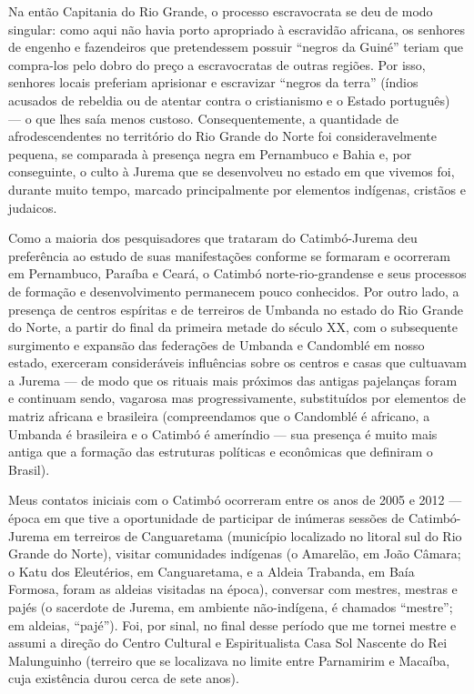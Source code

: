 \begin{refsection}
    Na então Capitania do Rio Grande, o processo escravocrata se deu de modo singular: como aqui não havia porto apropriado à escravidão africana, os senhores de engenho e fazendeiros que pretendessem possuir ``negros da Guiné'' teriam que compra-los pelo dobro do preço a escravocratas de outras regiões. Por isso, senhores locais preferiam aprisionar e escravizar ``negros da terra'' (índios acusados de rebeldia ou de atentar contra o cristianismo e o Estado português) --- o que lhes saía menos custoso. Consequentemente, a quantidade de afrodescendentes no território do Rio Grande do Norte foi consideravelmente pequena, se comparada à presença negra em Pernambuco e Bahia e, por conseguinte, o culto à Jurema que se desenvolveu no estado em que vivemos foi, durante muito tempo, marcado principalmente por elementos indígenas, cristãos e judaicos. 

    Como a maioria dos pesquisadores que trataram do Catimbó-Jurema deu preferência ao estudo de suas manifestações conforme se formaram e ocorreram em Pernambuco, Paraíba e Ceará, o Catimbó norte-rio-grandense e seus processos de formação e desenvolvimento permanecem pouco conhecidos. Por outro lado, a presença de centros espíritas e de terreiros de Umbanda no estado do Rio Grande do Norte, a partir do final da primeira metade do século XX, com o subsequente surgimento e expansão das federações de Umbanda e Candomblé em nosso estado, exerceram consideráveis influências sobre os centros e casas que cultuavam a Jurema --- de modo que os rituais mais próximos das antigas pajelanças foram e continuam sendo, vagarosa mas progressivamente, substituídos por elementos de matriz africana e brasileira (compreendamos que o Candomblé é africano, a Umbanda é brasileira e o Catimbó é ameríndio --- sua presença é muito mais antiga que a formação das estruturas políticas e econômicas que definiram o Brasil). 

    Meus contatos iniciais com o Catimbó ocorreram entre os anos de 2005 e 2012 --- época em que tive a oportunidade de participar de inúmeras sessões de Catimbó-Jurema em terreiros de Canguaretama (município localizado no litoral sul do Rio Grande do Norte), visitar comunidades indígenas (o Amarelão, em João Câmara; o Katu dos Eleutérios, em Canguaretama, e a Aldeia Trabanda, em Baía Formosa, foram as aldeias visitadas na época), conversar com mestres, mestras e pajés (o sacerdote de Jurema, em ambiente não-indígena, é chamados ``mestre''; em aldeias, ``pajé''). Foi, por sinal, no final desse período que me tornei mestre e assumi a direção do Centro Cultural e Espiritualista Casa Sol Nascente do Rei Malunguinho (terreiro que se localizava no limite entre Parnamirim e Macaíba, cuja existência durou cerca de sete anos). 


\end{refsection}
